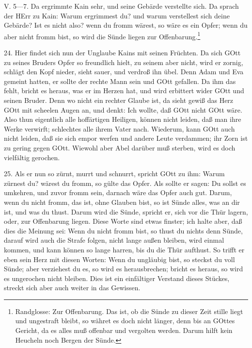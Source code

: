 \begin{schriftzitat}
V. 5—7. Da ergrimmte Kain sehr, und seine Gebärde verstellte sich. Da sprach der HErr zu Kain: Warum ergrimmest du? und warum verstellest sich deine Gebärde? Ist es nicht also? wenn du fromm wärest, so wäre es ein Opfer; wenn du aber nicht fromm bist, so wird die Sünde liegen zur Offenbarung.\footnote{Randglosse: Zur Offenbarung. Das ist, ob die Sünde zu dieser Zeit stille liegt und ungestraft bleibt, so währet es doch nicht länger, denn bis an GOttes Gericht, da es alles muß offenbar und vergolten werden. Darum hilft kein Heucheln noch Bergen der Sünde.}
\end{schriftzitat}

24. Hier findet sich nun der Unglaube Kains mit seinen Früchten. Da sich GOtt zu seines Bruders Opfer so freundlich hielt, zu seinem aber nicht, wird er zornig, schlägt den Kopf nieder, sieht sauer, und verdroß ihn übel. Denn Adam und Eva gemeint hatten, er sollte der rechte Mann sein und GOtt gefallen. Da ihm das fehlt, bricht es heraus, was er im Herzen hat, und wird erbittert wider GOtt und seinen Bruder. Denn wo nicht ein rechter Glaube ist, da sieht gewiß das Herz GOtt mit scheelen Augen an, und denkt: Ich wollte, daß GOtt nicht GOtt wäre. Also thun eigentlich alle hoffärtigen Heiligen, können nicht leiden, daß man ihre Werke verwirft; schlechtes alle ihrem Vater nach. Wiederum, kann GOtt auch nicht leiden, daß sie sich empor werfen und andere Leute verdammen; ihr Zorn ist zu gering gegen GOtt. Wiewohl aber Abel darüber muß sterben, wird es doch vielfältig gerochen.

25. Als er nun so zürnt, murrt und schnurrt, spricht GOtt zu ihm: Warum zürnest du? wärest du fromm, so gülte das Opfer. Als sollte er sagen: Du sollst es umkehren, und zuvor fromm sein, darnach wäre das Opfer auch gut. Darum, wenn du nicht fromm, das ist, ohne Glauben bist, so ist Sünde alles, was an dir ist, und was du thust. Darum wird die Sünde, spricht er, sich vor die Thür lagern, oder, zur Offenbarung liegen. Diese Worte sind etwas finster; ich halte aber, daß dies die Meinung sei: Wenn du nicht fromm bist, so thust du nichts denn Sünde, darauf wird auch die Strafe folgen, nicht lange außen bleiben, wird einmal kommen, und kann können so lange harren, bis du die Thür aufthust. So trifft er eben sein Herz mit diesen Worten: Wenn du ungläubig bist, so steckst du voll Sünde; aber verziehest du es, so wird es herausbrechen; bricht es heraus, so wird es ungerochen nicht bleiben. Dies ist ein einfältiger Verstand dieses Stückes, streckt sich aber auch weiter in das Gewissen.


